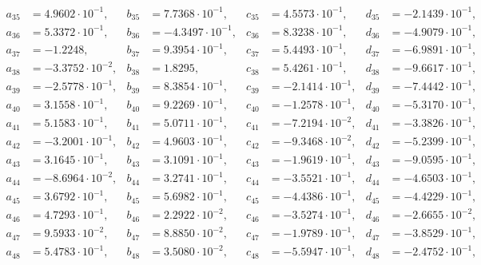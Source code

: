 \begin{align*}
  a_{ 35 } &= 4.9602 \cdot 10^{ -1 }, & b_{ 35 } &= 7.7368 \cdot 10^{ -1 }, & c_{ 35 } &= 4.5573 \cdot 10^{ -1 }, & d_{ 35 } &= -2.1439 \cdot 10^{ -1 }, \\ 
  a_{ 36 } &= 5.3372 \cdot 10^{ -1 }, & b_{ 36 } &= -4.3497 \cdot 10^{ -1 }, & c_{ 36 } &= 8.3238 \cdot 10^{ -1 }, & d_{ 36 } &= -4.9079 \cdot 10^{ -1 }, \\ 
  a_{ 37 } &= -1.2248, & b_{ 37 } &= 9.3954 \cdot 10^{ -1 }, & c_{ 37 } &= 5.4493 \cdot 10^{ -1 }, & d_{ 37 } &= -6.9891 \cdot 10^{ -1 }, \\ 
  a_{ 38 } &= -3.3752 \cdot 10^{ -2 }, & b_{ 38 } &= 1.8295, & c_{ 38 } &= 5.4261 \cdot 10^{ -1 }, & d_{ 38 } &= -9.6617 \cdot 10^{ -1 }, \\ 
  a_{ 39 } &= -2.5778 \cdot 10^{ -1 }, & b_{ 39 } &= 8.3854 \cdot 10^{ -1 }, & c_{ 39 } &= -2.1414 \cdot 10^{ -1 }, & d_{ 39 } &= -7.4442 \cdot 10^{ -1 }, \\ 
  a_{ 40 } &= 3.1558 \cdot 10^{ -1 }, & b_{ 40 } &= 9.2269 \cdot 10^{ -1 }, & c_{ 40 } &= -1.2578 \cdot 10^{ -1 }, & d_{ 40 } &= -5.3170 \cdot 10^{ -1 }, \\ 
  a_{ 41 } &= 5.1583 \cdot 10^{ -1 }, & b_{ 41 } &= 5.0711 \cdot 10^{ -1 }, & c_{ 41 } &= -7.2194 \cdot 10^{ -2 }, & d_{ 41 } &= -3.3826 \cdot 10^{ -1 }, \\ 
  a_{ 42 } &= -3.2001 \cdot 10^{ -1 }, & b_{ 42 } &= 4.9603 \cdot 10^{ -1 }, & c_{ 42 } &= -9.3468 \cdot 10^{ -2 }, & d_{ 42 } &= -5.2399 \cdot 10^{ -1 }, \\ 
  a_{ 43 } &= 3.1645 \cdot 10^{ -1 }, & b_{ 43 } &= 3.1091 \cdot 10^{ -1 }, & c_{ 43 } &= -1.9619 \cdot 10^{ -1 }, & d_{ 43 } &= -9.0595 \cdot 10^{ -1 }, \\ 
  a_{ 44 } &= -8.6964 \cdot 10^{ -2 }, & b_{ 44 } &= 3.2741 \cdot 10^{ -1 }, & c_{ 44 } &= -3.5521 \cdot 10^{ -1 }, & d_{ 44 } &= -4.6503 \cdot 10^{ -1 }, \\ 
  a_{ 45 } &= 3.6792 \cdot 10^{ -1 }, & b_{ 45 } &= 5.6982 \cdot 10^{ -1 }, & c_{ 45 } &= -4.4386 \cdot 10^{ -1 }, & d_{ 45 } &= -4.4229 \cdot 10^{ -1 }, \\ 
  a_{ 46 } &= 4.7293 \cdot 10^{ -1 }, & b_{ 46 } &= 2.2922 \cdot 10^{ -2 }, & c_{ 46 } &= -3.5274 \cdot 10^{ -1 }, & d_{ 46 } &= -2.6655 \cdot 10^{ -2 }, \\ 
  a_{ 47 } &= 9.5933 \cdot 10^{ -2 }, & b_{ 47 } &= 8.8850 \cdot 10^{ -2 }, & c_{ 47 } &= -1.9789 \cdot 10^{ -1 }, & d_{ 47 } &= -3.8529 \cdot 10^{ -1 }, \\ 
  a_{ 48 } &= 5.4783 \cdot 10^{ -1 }, & b_{ 48 } &= 3.5080 \cdot 10^{ -2 }, & c_{ 48 } &= -5.5947 \cdot 10^{ -1 }, & d_{ 48 } &= -2.4752 \cdot 10^{ -1 }, \\ 

\end{align*}
